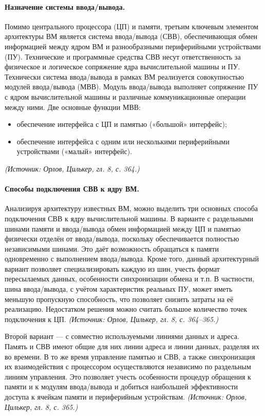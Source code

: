 \documentclass[a4paper,12pt]{article}
\begin{document}
\paragraph{Назначение системы ввода/вывода.}
Помимо центрального процессора (ЦП) и памяти, третьим ключевым элементом архитектуры ВМ является система ввода/вывода (СВВ), обеспечивающая обмен информацией между ядром ВМ и разнообразными периферийными устройствами (ПУ). Технические и программные средства СВВ несут ответственность за физическое и логическое сопряжение ядра вычислительной машины и ПУ. Технически система ввода/вывода в рамках ВМ реализуется совокупностью модулей ввода/вывода (МВВ). Модуль ввода/вывода выполняет сопряжение ПУ с ядром вычислительной машины и различные коммуникационные операции между ними. Две основные функции МВВ:
\begin{itemize}
\item обеспечение интерфейса с ЦП и памятью («большой» интерфейс);
\item обеспечение интерфейса с одним или несколькими периферийными устройствами («малый» интерфейс).
\end{itemize}
\textit{(Источник: Орлов, Цилькер, гл. 8, с. 364.)}

\paragraph{Способы подключения СВВ к ядру ВМ.}
Анализируя архитектуру известных ВМ, можно выделить три основных способа подключения СВВ к ядру вычислительной машины. В варианте с раздельными шинами памяти и ввода/вывода обмен информацией между ЦП и памятью физически отделён от ввода/вывода, поскольку обеспечивается полностью независимыми шинами. Это даёт возможность обращаться к памяти одновременно с выполнением ввода/вывода. Кроме того, данный архитектурный вариант позволяет специализировать каждую из шин, учесть формат пересылаемых данных, особенности синхронизации обмена и т.п. В частности, шина ввода/вывода, с учётом характеристик реальных ПУ, может иметь меньшую пропускную способность, что позволяет снизить затраты на её реализацию. Недостатком решения можно считать большое количество точек подключения к ЦП.
\textit{(Источник: Орлов, Цилькер, гл. 8, с. 364--365.)}

Второй вариант — с совместно используемыми линиями данных и адреса. Память и СВВ имеют общие для них линии адреса и линии данных, разделяя их во времени. В то же время управление памятью и СВВ, а также синхронизация их взаимодействия с процессором осуществляются независимо по раздельным линиям управления. Это позволяет учесть особенности процедур обращения к памяти и к модулям ввода/вывода и добиться наибольшей эффективности доступа к ячейкам памяти и периферийным устройствам.
\textit{(Источник: Орлов, Цилькер, гл. 8, с. 365.)}
\end{document}
